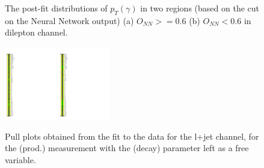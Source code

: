 \begin{figure}[ht]
  \centering
  \quad \quad
  \caption{The post-fit distributions of $p_T(\gamma)$ in two regions (based on the cut on the Neural Network output) (a) $O_{NN}>=0.6$ (b) $O_{NN}<0.6$ 
  in dilepton channel.}
  \label{fig:pt_postfit_dilep_realdata}
\end{figure}
\FloatBarrier



\begin{figure}[ht]
  \centering
  \includegraphics[width=0.20\textwidth]{figures/diff_xsec/ljet_tty_prod_mu_blinded/compare_NP_pulls/compare_NP_dilep_fits_pt_ptj1_eta/NuisPar_comp.pdf}
  \quad \quad
  \includegraphics[width=0.20\textwidth]{figures/diff_xsec/ljet_tty_prod_mu_blinded/compare_NP_pulls/compare_NP_dilep_fits_drphb_drlj_dr/NuisPar_comp.pdf}
  \caption{Pull plots obtained from the fit to the data for the l+jet channel, for the \tty (prod.) measurement 
  with the \tty (decay) parameter left as a free variable.}
  \label{fig:pull_plot_pt_tty_dec_free_ljet_mu_blinded}
\end{figure}
\FloatBarrier


